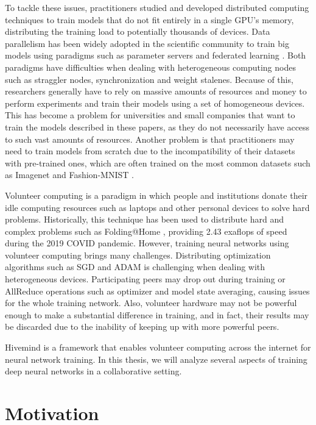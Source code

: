 To tackle these issues, practitioners studied and developed distributed computing techniques to train models that do not fit entirely in a single GPU's memory, distributing the training load to potentially thousands of devices.
Data parallelism has been widely adopted in the scientific community to train big models using paradigms such as parameter servers \cite{NIPS20141ff1de77, 10.5555/2685048.2685095} and federated learning \cite{DBLP:journals/corr/abs-1907-09693}.
Both paradigms have difficulties when dealing with heterogeneous computing nodes such as straggler nodes, synchronization and weight stalenes.
Because of this, researchers generally have to rely on massive amounts of resources and money to perform experiments and train their models using a set of homogeneous devices.
This has become a problem for universities and small companies that want to train the models described in these papers, as they do not necessarily have access to such vast amounts of resources.
Another problem is that practitioners may need to train models from scratch due to the incompatibility of their datasets with pre-trained ones, which are often trained on the most common datasets such as Imagenet \cite{deng2009imagenet} and Fashion-MNIST \cite{DBLP:journals/corr/abs-1708-07747}.

Volunteer computing is a paradigm in which people and institutions donate their idle computing resources such as laptops and other personal devices to solve hard problems.
Historically, this technique has been used to distribute hard and complex problems such as Folding@Home \cite{10.1109/IPDPS.2009.5160922}, providing 2.43 exaflops of speed during the 2019 COVID pandemic.
However, training neural networks using volunteer computing brings many challenges.
Distributing optimization algorithms such as SGD and ADAM is challenging when dealing with heterogeneous devices.
Participating peers may drop out during training or AllReduce operations such as optimizer and model state averaging, causing issues for the whole training network.
Also, volunteer hardware may not be powerful enough to make a substantial difference in training, and in fact, their results may be discarded due to the inability of keeping up with more powerful peers.

Hivemind \cite{riabinin2020hivemind} is a framework that enables volunteer computing across the internet for neural network training.
In this thesis, we will analyze several aspects of training deep neural networks in a collaborative setting.

\section{Motivation}

